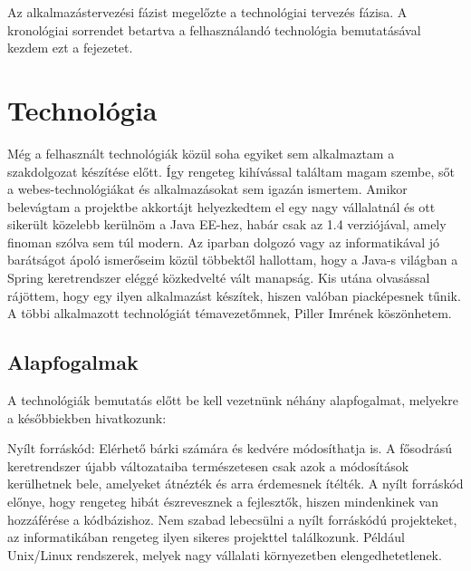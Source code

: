 



 
Az alkalmazástervezési fázist megelőzte a technológiai tervezés fázisa. A kronológiai sorrendet betartva a felhasználandó technológia bemutatásával kezdem ezt a fejezetet.  

\section{Technológia}
Még a felhasznált technológiák közül soha egyiket sem alkalmaztam a szakdolgozat készítése előtt. Így rengeteg kihívással találtam magam szembe, sőt a webes-technológiákat és alkalmazásokat sem igazán ismertem. Amikor belevágtam a projektbe akkortájt helyezkedtem el egy nagy vállalatnál és ott sikerült közelebb kerülnöm a Java EE-hez, habár csak az 1.4 verziójával, amely finoman szólva sem túl modern. Az iparban dolgozó vagy az informatikával jó barátságot ápoló ismerőseim közül többektől hallottam, hogy a Java-s világban a Spring keretrendszer eléggé közkedvelté vált manapság. Kis utána olvasással rájöttem, hogy egy ilyen alkalmazást készítek, hiszen valóban piacképesnek tűnik. A többi alkalmazott technológiát témavezetőmnek, Piller Imrének köszönhetem. 

\subsection{Alapfogalmak}
A technológiák bemutatás előtt be kell vezetnünk néhány alapfogalmat, melyekre a későbbiekben hivatkozunk:

Nyílt forráskód: Elérhető bárki számára és kedvére módosíthatja is. A fősodrású keretrendszer újabb változataiba természetesen csak azok a módosítások kerülhetnek bele, amelyeket átnézték és arra érdemesnek ítélték. A nyílt forráskód előnye, hogy rengeteg hibát észrevesznek a fejlesztők, hiszen mindenkinek van hozzáférése a kódbázishoz. Nem szabad lebecsülni a nyílt forráskódú projekteket, az informatikában rengeteg ilyen sikeres projekttel találkozunk. Például Unix/Linux rendszerek, melyek nagy vállalati környezetben elengedhetetlenek.

